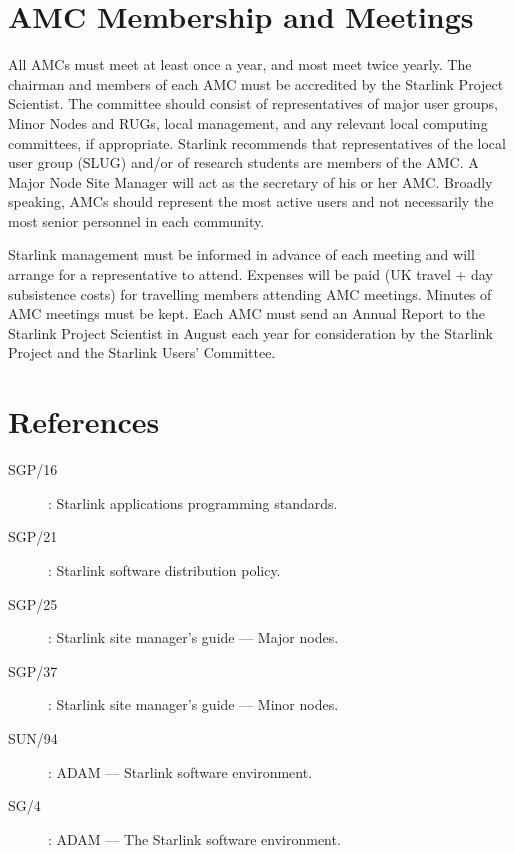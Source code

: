 \section{AMC Membership and Meetings}

All AMCs must meet at least once a year, and most meet twice yearly.
The chairman and members of each AMC must be accredited by the Starlink Project
Scientist.
The committee should consist of representatives of major user groups, Minor
Nodes and RUGs, local management, and any relevant local computing committees,
if appropriate.
Starlink recommends that representatives of the local user group (SLUG) and/or
of research students are members of the AMC.
A Major Node Site Manager will act as the secretary of his or her AMC.
Broadly speaking, AMCs should represent the most active users and not
necessarily the most senior personnel in each community.

Starlink management must be informed in advance of each meeting and will
arrange for a representative to attend.
Expenses will be paid (UK travel $+$ day subsistence costs) for travelling
members attending AMC meetings.
Minutes of AMC meetings must be kept.
Each AMC must send an Annual Report to the Starlink Project Scientist in August
each year for consideration by the Starlink Project and the Starlink Users'
Committee.

\section {References}

\begin{description}
\item [SGP/16]: Starlink applications programming standards.
\item [SGP/21]: Starlink software distribution policy.
\item [SGP/25]: Starlink site manager's guide --- Major nodes.
\item [SGP/37]: Starlink site manager's guide --- Minor nodes.
\item [SUN/94]: ADAM --- Starlink software environment.
\item [SG/4]:   ADAM --- The Starlink software environment.
\end{description}

